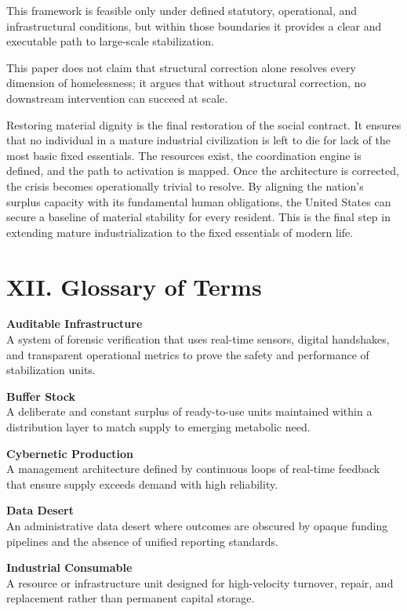 \documentclass[
  12pt,
]{article}
\begin{document}
This framework is feasible only under defined statutory, operational, and infrastructural conditions, but within those boundaries it provides a clear and executable path to large‑scale stabilization.

This paper does not claim that structural correction alone resolves every dimension of homelessness; it argues that without structural correction, no downstream intervention can succeed at scale.

Restoring material dignity is the final restoration of the social contract. It ensures that no individual in a mature industrial civilization is left to die for lack of the most basic fixed essentials. The resources exist, the coordination engine is defined, and the path to activation is mapped. Once the architecture is corrected, the crisis becomes operationally trivial to resolve. By aligning the nation's surplus capacity with its fundamental human obligations, the United States can secure a baseline of material stability for every resident. This is the final step in extending mature industrialization to the fixed essentials of modern life.

\newpage\renewcommand{\baselinestretch}{1.0}\normalsize

\hypertarget{xii.-glossary-of-terms}{%
\section{XII. Glossary of Terms}\label{xii.-glossary-of-terms}}

\textbf{Auditable Infrastructure}\\
A system of forensic verification that uses real-time sensors, digital handshakes, and transparent operational metrics to prove the safety and performance of stabilization units.

\textbf{Buffer Stock}\\
A deliberate and constant surplus of ready-to-use units maintained within a distribution layer to match supply to emerging metabolic need.

\textbf{Cybernetic Production}\\
A management architecture defined by continuous loops of real-time feedback that ensure supply exceeds demand with high reliability.

\textbf{Data Desert}\\
An administrative data desert where outcomes are obscured by opaque funding pipelines and the absence of unified reporting standards.

\textbf{Industrial Consumable}\\
A resource or infrastructure unit designed for high-velocity turnover, repair, and replacement rather than permanent capital storage.
\end{document}
